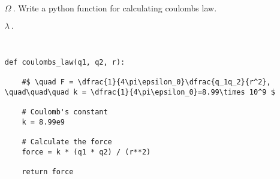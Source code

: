 \documentclass{article}
\begin{document}
\ttfamily
\sloppy
\vspace*{\fill}
\begin{itemize}
	\item[\textcolor{ORANGE15}{$\Omega ~.$}]\textcolor{ORANGE15}{Write a python function for calculating coulombs law.}
	\item[\textcolor{GRAY20}{$\lambda ~.$}]
\begin{verbatim}


def coulombs_law(q1, q2, r):
    
    #$ \quad F = \dfrac{1}{4\pi\epsilon_0}\dfrac{q_1q_2}{r^2}, \quad\quad\quad k = \dfrac{1}{4\pi\epsilon_0}=8.99\times 10^9 $
    
    # Coulomb's constant
    k = 8.99e9
    
    # Calculate the force
    force = k * (q1 * q2) / (r**2)
    
    return force
\end{verbatim}
\end{itemize}
\vspace*{\fill}
\end{document}
